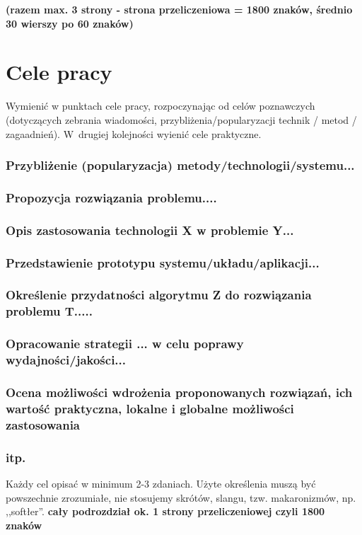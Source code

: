 \documentclass[12pt]{report}
\begin{document}
{\bf (razem max. 3 strony - strona przeliczeniowa = 1800 znaków, średnio 30 wierszy po 60 znaków)}





\section{Cele pracy}
Wymienić w punktach cele pracy, rozpoczynając od celów poznawczych (dotyczą\-cych
zebrania wiadomości, przybliżenia/popularyzacji technik / metod / zagaadnień).
W~drugiej kolejności wyienić cele praktyczne.
\subsubsection{Przybliżenie (popularyzacja) metody/technologii/systemu...}
\subsubsection{Propozycja rozwiązania problemu....}
\subsubsection{Opis zastosowania technologii X w problemie Y...}
\subsubsection{Przedstawienie prototypu systemu/układu/aplikacji...}
\subsubsection{Określenie przydatności algorytmu Z do rozwiązania problemu T.....
}
\subsubsection{Opracowanie strategii ... w celu poprawy wydajności/jakości...}
\subsubsection{Ocena możliwości wdrożenia proponowanych rozwiązań, ich wartość
praktyczna, lokalne i globalne możliwości zastosowania}
\subsubsection{itp.}

Każdy cel opisać w minimum 2-3 zdaniach. Użyte określenia muszą być powszechnie
zrozumiałe, nie stosujemy skrótów, slangu,  tzw. makaronizmów, np. ,,softłer''.
{\bf cały podrozdział ok. 1 strony przeliczeniowej czyli 1800 znaków}
\end{document}
